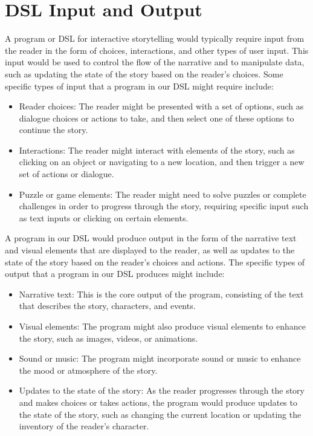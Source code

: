 \section{DSL Input and Output}


A program or DSL for interactive storytelling would typically require input from the reader in the form of choices, interactions, and other types of user input. This input would be used to control the flow of the narrative and to manipulate data, such as updating the state of the story based on the reader's choices.
Some specific types of input that a program in our DSL might require include:

\begin{itemize}
                \item Reader choices: The reader might be presented with a set of options, such as dialogue choices or actions to take, and then select one of these options to continue the story.
                \item Interactions: The reader might interact with elements of the story, such as clicking on an object or navigating to a new location, and then trigger a new set of actions or dialogue.
                \item Puzzle or game elements: The reader might need to solve puzzles or complete challenges in order to progress through the story, requiring specific input such as text inputs or clicking on certain elements.
 \end{itemize}
A program in our DSL would produce output in the form of the narrative text and visual elements that are displayed to the reader, as well as updates to the state of the story based on the reader's choices and actions. The specific types of output that a program in our DSL produces might include:

\begin{itemize}
                \item Narrative text: This is the core output of the program, consisting of the text that describes the story, characters, and events.
                \item Visual elements: The program might also produce visual elements to enhance the story, such as images, videos, or animations.
                \item Sound or music: The program might incorporate sound or music to enhance the mood or atmosphere of the story.
                \item Updates to the state of the story: As the reader progresses through the story and makes choices or takes actions, the program would produce updates to the state of the story, such as changing the current location or updating the inventory of the reader's character.
 \end{itemize}



